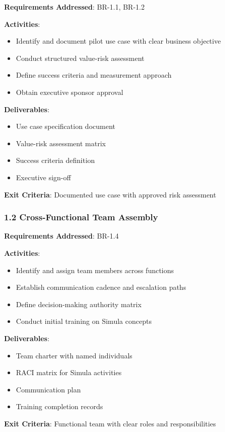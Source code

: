 \documentclass[12pt,a4paper,twoside]{report}
\begin{document}
\begin{tcolorbox}[colback=blue!5,colframe=blue!70,title=1.1 Use Case and Risk Assessment]
\textbf{Requirements Addressed}: BR-1.1, BR-1.2

\textbf{Activities}:
\begin{itemize}
\item Identify and document pilot use case with clear business objective
\item Conduct structured value-risk assessment
\item Define success criteria and measurement approach
\item Obtain executive sponsor approval
\end{itemize}

\textbf{Deliverables}:
\begin{itemize}
\item Use case specification document
\item Value-risk assessment matrix
\item Success criteria definition
\item Executive sign-off
\end{itemize}

\textbf{Exit Criteria}: Documented use case with approved risk assessment
\end{tcolorbox}

\subsubsection{1.2 Cross-Functional Team Assembly}

\begin{tcolorbox}[colback=blue!5,colframe=blue!70,title=1.2 Team Organization]
\textbf{Requirements Addressed}: BR-1.4

\textbf{Activities}:
\begin{itemize}
\item Identify and assign team members across functions
\item Establish communication cadence and escalation paths
\item Define decision-making authority matrix
\item Conduct initial training on Simula concepts
\end{itemize}

\textbf{Deliverables}:
\begin{itemize}
\item Team charter with named individuals
\item RACI matrix for Simula activities
\item Communication plan
\item Training completion records
\end{itemize}

\textbf{Exit Criteria}: Functional team with clear roles and responsibilities
\end{tcolorbox}
\end{document}
